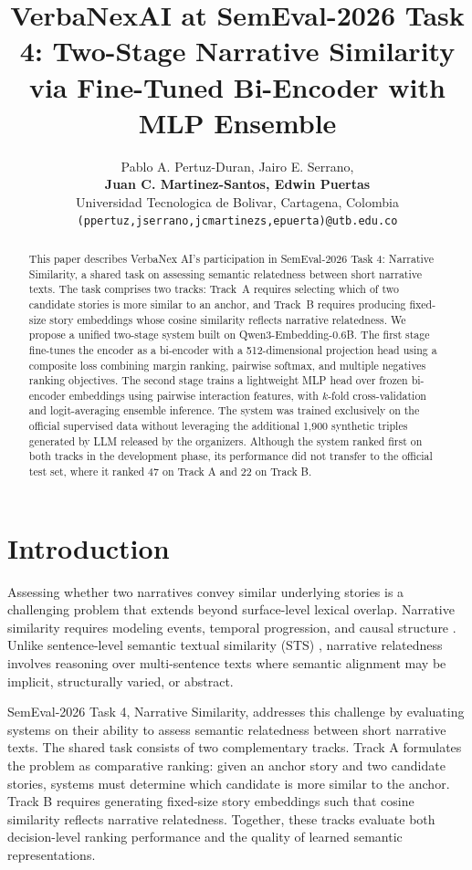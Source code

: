 \documentclass[11pt]{article}
\title{VerbaNexAI at SemEval-2026 Task 4: Two-Stage Narrative Similarity via Fine-Tuned Bi-Encoder with MLP Ensemble}
\author{
  Pablo A. Pertuz-Duran, Jairo E. Serrano, \\
  \textbf{Juan C. Martinez-Santos, Edwin Puertas}\\
  Universidad Tecnologica de Bolivar, Cartagena, Colombia \\
  \texttt{(ppertuz,jserrano,jcmartinezs,epuerta)@utb.edu.co}
}
\begin{document}
\maketitle

\begin{abstract}
This paper describes VerbaNex AI's participation in SemEval-2026 Task 4: Narrative Similarity, a shared task on assessing semantic relatedness between short narrative texts. The task comprises two tracks: Track~A requires selecting which of two candidate stories is more similar to an anchor, and Track~B requires producing fixed-size story embeddings whose cosine similarity reflects narrative relatedness. We propose a unified two-stage system built on Qwen3-Embedding-0.6B. The first stage fine-tunes the encoder as a bi-encoder with a 512-dimensional projection head using a composite loss combining margin ranking, pairwise softmax, and multiple negatives ranking objectives. The second stage trains a lightweight MLP head over frozen bi-encoder embeddings using pairwise interaction features, with $k$-fold cross-validation and logit-averaging ensemble inference. The system was trained exclusively on the official supervised data without leveraging the additional 1,900 synthetic triples generated by LLM released by the organizers. 
Although the system ranked first on both tracks in the development phase, its performance did not transfer to the official test set, where it ranked 47 on Track A and 22 on Track B.
\end{abstract}


\section{Introduction}

Assessing whether two narratives convey similar underlying stories is a challenging problem that extends beyond surface-level lexical overlap. Narrative similarity requires modeling events, temporal progression, and causal structure \cite{chambers2008unsupervised}. Unlike sentence-level semantic textual similarity (STS) \cite{cer2017semeval}, narrative relatedness involves reasoning over multi-sentence texts where semantic alignment may be implicit, structurally varied, or abstract.

SemEval-2026 Task 4, Narrative Similarity, addresses this challenge by evaluating systems on their ability to assess semantic relatedness between short narrative texts. The shared task consists of two complementary tracks. Track A formulates the problem as comparative ranking: given an anchor story and two candidate stories, systems must determine which candidate is more similar to the anchor. Track B requires generating fixed-size story embeddings such that cosine similarity reflects narrative relatedness. Together, these tracks evaluate both decision-level ranking performance and the quality of learned semantic representations.
\end{document}
